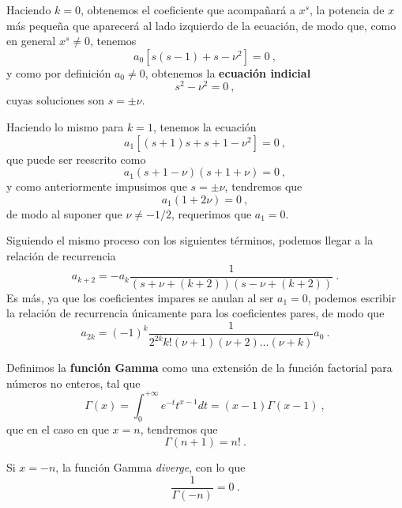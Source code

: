 Haciendo $k = 0$, obtenemos el coeficiente que acompañará a $x^s$, la potencia de $x$ más pequeña que aparecerá al lado izquierdo de la ecuación, de modo que, como en general $x^s \neq 0$, tenemos
\begin{equation}
    a_0 \left[ s(s-1) + s - \nu^2 \right] = 0 \ ,
\end{equation}
y como por definición $a_0 \neq 0$, obtenemos la \textbf{ecuación indicial}
\begin{equation}
    s^2 - \nu^2 = 0 \ ,
\end{equation}
cuyas soluciones son $s = \pm \nu$.

Haciendo lo mismo para $k = 1$, tenemos la ecuación
\begin{equation}
    a_1\left[ (s+1)s + s + 1 - \nu^2 \right] = 0 \ ,
\end{equation}
que puede ser reescrito como
\begin{equation}
    a_1(s + 1 - \nu)(s + 1 + \nu) = 0 \ ,
\end{equation}
y como anteriormente impusimos que $s=\pm \nu$, tendremos que
\begin{equation}
    a_1 (1 + 2\nu) = 0 \ ,
\end{equation}
de modo al suponer que $\nu \neq -1/2$, requerimos que $a_1 = 0$.

Siguiendo el mismo proceso con los siguientes términos, podemos llegar a la relación de recurrencia
\begin{equation}
    a_{k + 2} = -a_k \frac{1}{(s+\nu+(k+2))(s-\nu+(k+2))} \ .
\end{equation} 
Es más, ya que los coeficientes impares se anulan al ser $a_1 = 0$, podemos escribir la relación de recurrencia únicamente para los coeficientes pares, de modo que
\begin{equation} \label{eq:recurrencia_Bessel}
    a_{2k} = (-1)^k \frac{1}{2^{2k} k! (\nu + 1) (\nu + 2) \dots (\nu + k)}a_0 \ .
\end{equation}

\begin{defi} 
    Definimos la \textbf{función Gamma} como una extensión de la función factorial para números no enteros, tal que
    \begin{equation}
        \Gamma(x) = \int_0^{+\infty} e^{-t} t^{x-1} dt = (x-1) \Gamma(x-1)\ ,
    \end{equation}
    que en el caso en que $x=n$, tendremos que
    \begin{equation}
        \Gamma(n+1) = n! \ .
    \end{equation}

    Si $x = -n$, la función Gamma \emph{diverge}, con lo que
    \begin{equation}
        \frac{1}{\Gamma(-n)} = 0 \ .
    \end{equation}
\end{defi}

